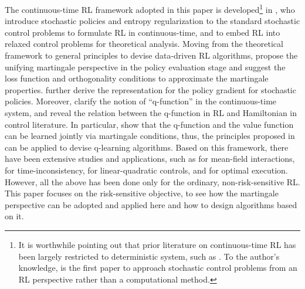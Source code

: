 The continuous-time RL framework adopted in this paper is developed\footnote{It is worthwhile pointing out that prior literature on continuous-time RL has been largely restricted to deterministic system, such as \cite{baird1994reinforcement,doya2000reinforcement,tallec2019making,lee2021policy,kim2021hamilton}. To the author's knowledge, \cite{wang2020reinforcement} is the first paper to approach stochastic control problems from an RL perspective rather than a computational method.} in \citet{wang2020reinforcement}, who introduce stochastic policies and entropy regularization to the standard stochastic control problems to formulate RL in continuous-time, and to embed RL into relaxed control problems \citep{fleming1984stochastic,zhou1992existence} for theoretical analysis. Moving from the theoretical framework to general principles to devise data-driven RL algorithms, \citet{jia2022policy} propose the unifying martingale perspective in the policy evaluation stage and suggest the loss function and orthogonality conditions to approximate the martingale properties. \citet{jia2022policypg} further derive the representation for the policy gradient for stochastic policies. Moreover, \citet{jia2022q} clarify the notion of ``q-function'' in the continuous-time system, and reveal the relation between the q-function in RL and Hamiltonian in control literature. In particular, \citet{jia2022q} show that the q-function and the value function can be learned jointly via martingale conditions, thus, the principles proposed in \cite{jia2022policy} can be applied to devise q-learning algorithms. Based on this framework, there have been extensive studies and applications, such as \cite{guo2022entropy,frikha2023actor,wei2023continuous} for mean-field interactions, \cite{dai2023learning} for time-inconsistency, \cite{wang2020continuous,szpruch2022optimal} for linear-quadratic controls, and \cite{wang2023reinforcement} for optimal execution. However, all the above has been done only for the ordinary, non-risk-sensitive RL. This paper focuses on the risk-sensitive objective, to see how the martingale perspective can be adopted and applied here and how to design algorithms based on it.


